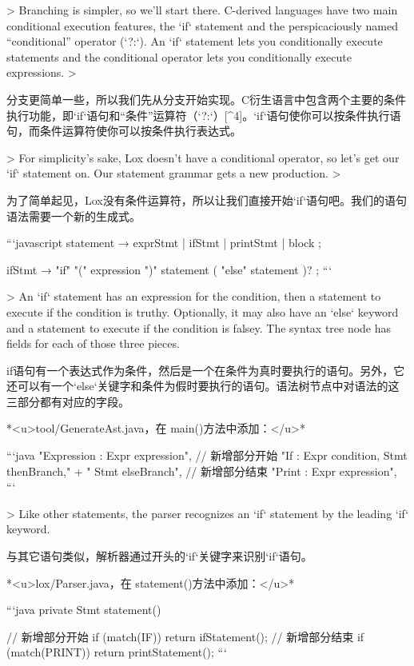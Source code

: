 \documentclass[cn,11pt,chinese]{elegantbook}
\begin{document}
{> Branching is simpler, so we’ll start there. C-derived languages have two main conditional execution features, the `if` statement and the perspicaciously named “conditional” operator (`?:`). An `if` statement lets you conditionally execute statements and the conditional operator lets you conditionally execute expressions.
>

分支更简单一些，所以我们先从分支开始实现。C衍生语言中包含两个主要的条件执行功能，即`if`语句和“条件”运算符（`?:`）[^4]。`if`语句使你可以按条件执行语句，而条件运算符使你可以按条件执行表达式。

> For simplicity’s sake, Lox doesn’t have a conditional operator, so let’s get our `if` statement on. Our statement grammar gets a new production.
>

为了简单起见，Lox没有条件运算符，所以让我们直接开始`if`语句吧。我们的语句语法需要一个新的生成式。

```javascript
statement      → exprStmt
               | ifStmt
               | printStmt
               | block ;

ifStmt         → "if" "(" expression ")" statement
               ( "else" statement )? ;
```

> An `if` statement has an expression for the condition, then a statement to execute if the condition is truthy. Optionally, it may also have an `else` keyword and a statement to execute if the condition is falsey. The syntax tree node has fields for each of those three pieces.

if语句有一个表达式作为条件，然后是一个在条件为真时要执行的语句。另外，它还可以有一个`else`关键字和条件为假时要执行的语句。语法树节点中对语法的这三部分都有对应的字段。

*<u>tool/GenerateAst.java，在 main()方法中添加：</u>*

```java
      "Expression : Expr expression",
      // 新增部分开始
      "If         : Expr condition, Stmt thenBranch," +
                  " Stmt elseBranch",
      // 新增部分结束
      "Print      : Expr expression",
```

> Like other statements, the parser recognizes an `if` statement by the leading `if` keyword.

与其它语句类似，解析器通过开头的`if`关键字来识别`if`语句。

*<u>lox/Parser.java，在 statement()方法中添加：</u>*

```java
  private Stmt statement() {
    // 新增部分开始
    if (match(IF)) return ifStatement();
    // 新增部分结束
    if (match(PRINT)) return printStatement();
```

}}
\end{document}
